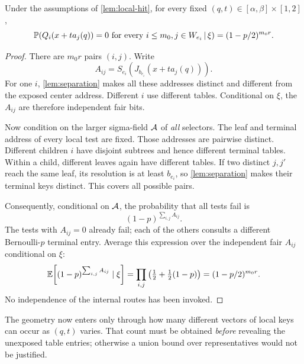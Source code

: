 \begin{lemma}\label{lem:failure}
Under the assumptions of \cref{lem:local-hit}, for every fixed
$(q,t)\in[\alpha,\beta]\times[1,2]$,
\begin{equation}\label{eq:failure}
 \mathbb P\!\left(Q_i(x+ta_j(q))=0\text{ for every }i\le m_0,
 j\in W_{e_i}\,\middle|\,\xi\right)
 =(1-p/2)^{m_0r}.
\end{equation}
\end{lemma}

\begin{proof}
There are $m_0r$ pairs $(i,j)$. Write
\[
 A_{ij}=S_{e_i}(J_{b_{e_i}}(x+ta_j(q))).
\]
For one $i$, \cref{lem:separation} makes all these addresses distinct
and different from the exposed center address. Different $i$ use
different tables. Conditional on $\xi$, the $A_{ij}$ are therefore
independent fair bits.

Now condition on the larger sigma-field $\mathcal A$ of \emph{all}
selectors. The leaf and terminal address of every local test are fixed.
Those addresses are pairwise distinct. Different children $i$ have
disjoint subtrees and hence different terminal tables. Within a child,
different leaves again have different tables. If two distinct $j,j'$
reach the same leaf, its resolution is at least $b_{e_i}$, so
\cref{lem:separation} makes their terminal keys distinct. This covers
all possible pairs.

Consequently, conditional on $\mathcal A$, the probability that all tests
fail is
\[
 (1-p)^{\sum_{i,j}A_{ij}}.
\]
The tests with $A_{ij}=0$ already fail; each of the others consults a
different Bernoulli-$p$ terminal entry. Average this expression over
the independent fair $A_{ij}$ conditional on $\xi$:
\[
 \mathbb E\!\left[(1-p)^{\sum_{i,j}A_{ij}}\mid\xi\right]
 =\prod_{i,j}\left(\tfrac12+\tfrac12(1-p)\right)
 =(1-p/2)^{m_0r}.
\]
No independence of the internal routes has been invoked.
\end{proof}

The geometry now enters only through how many different vectors of
local keys can occur as $(q,t)$ varies. That count must be obtained
\emph{before} revealing the unexposed table entries; otherwise a
union bound over representatives would not be justified.
